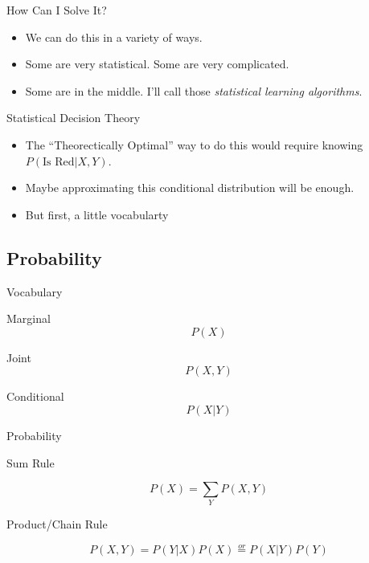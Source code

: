 \documentclass[12pt,ignorenonframetext,]{beamer}
\begin{document}
\begin{frame}{How Can I Solve It?}
\protect\hypertarget{how-can-i-solve-it}{}

\begin{itemize}
\item
  We can do this in a variety of ways.
\item
  Some are very statistical. Some are very complicated.
\item
  Some are in the middle. I'll call those \emph{statistical learning
  algorithms}.
\end{itemize}

\end{frame}

\begin{frame}{Statistical Decision Theory}
\protect\hypertarget{statistical-decision-theory}{}

\begin{itemize}
\item
  The ``Theorectically Optimal'' way to do this would require knowing
  \(P( \mbox{Is Red} \vert X,Y)\).
\item
  Maybe approximating this conditional distribution will be enough.
\item
  But first, a little vocabularty
\end{itemize}

\end{frame}

\hypertarget{probability}{%
\subsection{Probability}\label{probability}}

\begin{frame}{Vocabulary}
\protect\hypertarget{vocabulary}{}

\begin{center}
Marginal $$P(X)$$

Joint $$P(X,Y)$$

Conditional $$P(X \vert Y)$$
\end{center}

\end{frame}

\begin{frame}{Probability}
\protect\hypertarget{probability-1}{}

Sum Rule

\[P(X) = \sum_Y P(X,Y)\]

Product/Chain Rule

\[P(X,Y) = P(Y|X)P(X) \overset{or}{=} P(X|Y)P(Y)\]

\end{frame}
\end{document}

